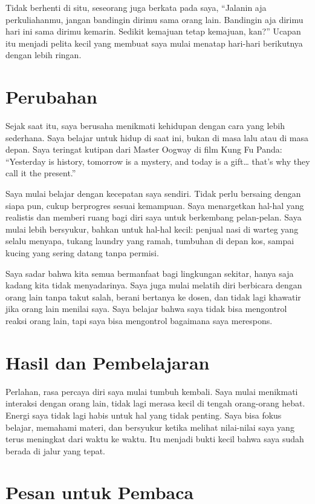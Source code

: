 \documentclass[
  letterpaper,
  DIV=11,
  numbers=noendperiod]{scrreprt}
\begin{document}
Tidak berhenti di situ, seseorang juga berkata pada saya, ``Jalanin aja
perkuliahanmu, jangan bandingin dirimu sama orang lain. Bandingin aja
dirimu hari ini sama dirimu kemarin. Sedikit kemajuan tetap kemajuan,
kan?'' Ucapan itu menjadi pelita kecil yang membuat saya mulai menatap
hari-hari berikutnya dengan lebih ringan.

\section{Perubahan}\label{perubahan}

Sejak saat itu, saya berusaha menikmati kehidupan dengan cara yang lebih
sederhana. Saya belajar untuk hidup di saat ini, bukan di masa lalu atau
di masa depan. Saya teringat kutipan dari Master Oogway di film Kung Fu
Panda: ``Yesterday is history, tomorrow is a mystery, and today is a
gift\ldots{} that's why they call it the present.''

Saya mulai belajar dengan kecepatan saya sendiri. Tidak perlu bersaing
dengan siapa pun, cukup berprogres sesuai kemampuan. Saya menargetkan
hal-hal yang realistis dan memberi ruang bagi diri saya untuk berkembang
pelan-pelan. Saya mulai lebih bersyukur, bahkan untuk hal-hal kecil:
penjual nasi di warteg yang selalu menyapa, tukang laundry yang ramah,
tumbuhan di depan kos, sampai kucing yang sering datang tanpa permisi.

Saya sadar bahwa kita semua bermanfaat bagi lingkungan sekitar, hanya
saja kadang kita tidak menyadarinya. Saya juga mulai melatih diri
berbicara dengan orang lain tanpa takut salah, berani bertanya ke dosen,
dan tidak lagi khawatir jika orang lain menilai saya. Saya belajar bahwa
saya tidak bisa mengontrol reaksi orang lain, tapi saya bisa mengontrol
bagaimana saya merespons.

\section{Hasil dan Pembelajaran}\label{hasil-dan-pembelajaran}

Perlahan, rasa percaya diri saya mulai tumbuh kembali. Saya mulai
menikmati interaksi dengan orang lain, tidak lagi merasa kecil di tengah
orang-orang hebat. Energi saya tidak lagi habis untuk hal yang tidak
penting. Saya bisa fokus belajar, memahami materi, dan bersyukur ketika
melihat nilai-nilai saya yang terus meningkat dari waktu ke waktu. Itu
menjadi bukti kecil bahwa saya sudah berada di jalur yang tepat.

\section{Pesan untuk Pembaca}\label{pesan-untuk-pembaca}
\end{document}
